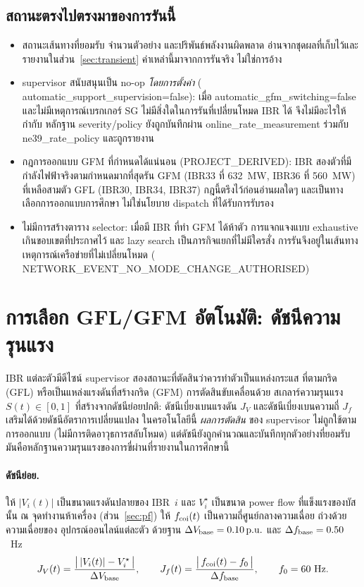 \documentclass[12pt,a4paper]{article}
\newcommand{\code}[1]{{\ttfamily\small\hyphenchar\font=-1 #1}}
\newcommand{\pu}{\ifmmode\,\mathrm{p.u.}\else\ p.u.\fi}
\begin{document}
\subsection{สถานะตรงไปตรงมาของการรันนี้}
\begin{itemize}
\item สถานะเส้นทางที่ยอมรับ จำนวนตัวอย่าง และปริพันธ์พลังงานผิดพลาด
      อ่านจากชุดผลที่เก็บไว้และรายงานในส่วน~\ref{sec:transient}
      ค่าเหล่านี้มาจากการรันจริง ไม่ใช่การอ้าง
\item supervisor สนับสนุนเป็น no-op \emph{โดยการตั้งค่า}
      (\code{automatic\_support\_supervision=false}): เมื่อ
      \code{automatic\_gfm\_switching=false} และไม่มีเหตุการณ์เบรกเกอร์ SG
      ไม่มีสิ่งใดในการรันที่เปลี่ยนโหมด IBR ได้ จึงไม่มีอะไรให้กำกับ
      หลักฐาน severity/policy ยังถูกบันทึกผ่าน \code{online\_rate\_measurement}
      ร่วมกับ \code{ne39\_rate\_policy} และถูกรายงาน
\item กฎการออกแบบ GFM ที่กำหนดได้แน่นอน (PROJECT\_DERIVED): IBR สองตัวที่มี
      กำลังไฟฟ้าจริงตามกำหนดมากที่สุดรัน GFM (IBR33 ที่ 632~MW, IBR36 ที่ 560~MW)
      ที่เหลือสามตัว GFL (IBR30, IBR34, IBR37) กฎนี้ตรึงไว้ก่อนอ่านผลใดๆ
      และเป็นทางเลือกการออกแบบการศึกษา ไม่ใช่นโยบาย dispatch ที่ได้รับการรับรอง
\item ไม่มีการสร้างตาราง selector: เมื่อมี IBR ที่ทำ GFM ได้ห้าตัว
      การแจกแจงแบบ exhaustive เกินขอบเขตที่ประกาศไว้ และ lazy search
      เป็นภารกิจแยกที่ไม่มีใครสั่ง การรันจึงอยู่ในเส้นทาง
      เหตุการณ์เครือข่ายที่ไม่เปลี่ยนโหมด
      (\code{NETWORK\_EVENT\_NO\_MODE\_CHANGE\_AUTHORISED})
\end{itemize}

\section{การเลือก GFL/GFM อัตโนมัติ: ดัชนีความรุนแรง}\label{sec:sev}

IBR แต่ละตัวมีดีไซน์ supervisor สองสถานะที่ตัดสินว่าควรทำตัวเป็นแหล่งกระแส
ที่ตามกริด (GFL) หรือเป็นแหล่งแรงดันที่สร้างกริด (GFM) การตัดสินขับเคลื่อนด้วย
สเกลาร์ความรุนแรง $S(t)\in[0,1]$ ที่สร้างจากดัชนีย่อยปกติ: ดัชนีเบี่ยงเบนแรงดัน
$J_V$ และดัชนีเบี่ยงเบนความถี่ $J_f$ เสริมได้ด้วยดัชนีอัตราการเปลี่ยนแปลง
ในครอโนโลยีนี้ \emph{ผลการตัดสิน} ของ supervisor ไม่ถูกใช้ตามการออกแบบ
(ไม่มีการติดอาวุธการสลับโหมด) แต่ดัชนียังถูกคำนวณและบันทึกทุกตัวอย่างที่ยอมรับ
มันคือหลักฐานความรุนแรงของการขี่ผ่านที่รายงานในการศึกษานี้

\paragraph{ดัชนีย่อย.}
ให้ $|V_i(t)|$ เป็นขนาดแรงดันปลายของ IBR~$i$ และ $V_i^{\star}$ เป็นขนาด
power flow ที่แข็งแรงของบัสนั้น ณ จุดทำงานห้าเครื่อง (ส่วน~\ref{sec:pf})
ให้ $f_{\rm coi}(t)$ เป็นความถี่ศูนย์กลางความเฉื่อย ถ่วงด้วยความเฉื่อยของ
อุปกรณ์ออนไลน์แต่ละตัว ด้วยฐาน $\Delta V_{\rm base}=0.10\pu$ และ
$\Delta f_{\rm base}=0.50$~Hz
\begin{equation}
  J_V(t)=\frac{\bigl|\,|V_i(t)|-V_i^{\star}\,\bigr|}{\Delta V_{\rm base}},
  \qquad
  J_f(t)=\frac{\bigl|\,f_{\rm coi}(t)-f_0\,\bigr|}{\Delta f_{\rm base}},
  \qquad f_0=60~\mathrm{Hz}.
  \label{eq:jvjf}
\end{equation}
\end{document}
